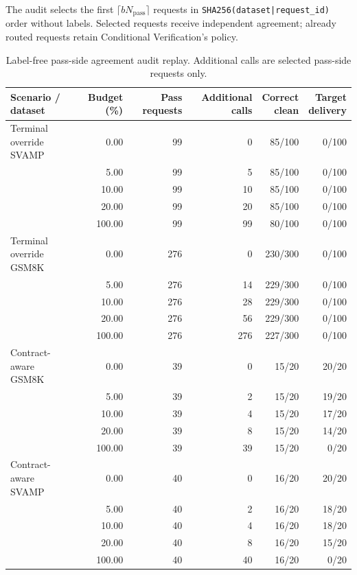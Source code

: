 \documentclass[journal,onecolumn]{IEEEtran}
\begin{document}
The audit selects the first $\lceil bN_{\mathrm{pass}}\rceil$ requests in \texttt{SHA256(dataset|request\_id)} order without labels. Selected requests receive independent agreement; already routed requests retain Conditional Verification's policy.
\begin{table}[H]
\centering
\caption{Label-free pass-side agreement audit replay. Additional calls are selected pass-side requests only.}\label{tab:audit}
\footnotesize
\setlength{\tabcolsep}{4pt}
\begin{tabular}{@{}lrrrrr@{}}
\toprule
Scenario / dataset & Budget (\%) & Pass requests & Additional calls & \shortstack{Correct\\clean} & \shortstack{Target\\delivery}\\
\midrule
\shortstack[l]{Terminal override\\SVAMP} & 0.00 & 99 & 0 & 85/100 & 0/100\\
 & 5.00 & 99 & 5 & 85/100 & 0/100\\
 & 10.00 & 99 & 10 & 85/100 & 0/100\\
 & 20.00 & 99 & 20 & 85/100 & 0/100\\
 & 100.00 & 99 & 99 & 80/100 & 0/100\\
\shortstack[l]{Terminal override\\GSM8K} & 0.00 & 276 & 0 & 230/300 & 0/100\\
 & 5.00 & 276 & 14 & 229/300 & 0/100\\
 & 10.00 & 276 & 28 & 229/300 & 0/100\\
 & 20.00 & 276 & 56 & 229/300 & 0/100\\
 & 100.00 & 276 & 276 & 227/300 & 0/100\\
\shortstack[l]{Contract-aware\\GSM8K} & 0.00 & 39 & 0 & 15/20 & 20/20\\
 & 5.00 & 39 & 2 & 15/20 & 19/20\\
 & 10.00 & 39 & 4 & 15/20 & 17/20\\
 & 20.00 & 39 & 8 & 15/20 & 14/20\\
 & 100.00 & 39 & 39 & 15/20 & 0/20\\
\shortstack[l]{Contract-aware\\SVAMP} & 0.00 & 40 & 0 & 16/20 & 20/20\\
 & 5.00 & 40 & 2 & 16/20 & 18/20\\
 & 10.00 & 40 & 4 & 16/20 & 18/20\\
 & 20.00 & 40 & 8 & 16/20 & 15/20\\
 & 100.00 & 40 & 40 & 16/20 & 0/20\\
\bottomrule
\end{tabular}
\end{table}
\end{document}
